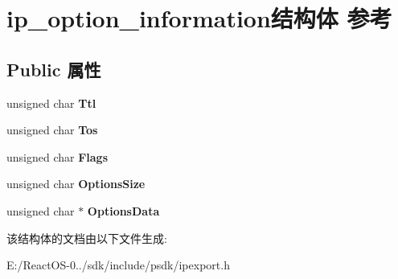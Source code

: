 \hypertarget{structip__option__information}{}\section{ip\+\_\+option\+\_\+information结构体 参考}
\label{structip__option__information}
\subsection*{Public 属性}
\begin{DoxyCompactItemize}
\item 
\mbox{\label{structip__option__information_a5a3a00ede902889832b7cfabcf227bbe}} 
unsigned char {\bfseries Ttl}
\item 
\mbox{\label{structip__option__information_a8ce99a7417c32f2d19bcc0819713b210}} 
unsigned char {\bfseries Tos}
\item 
\mbox{\label{structip__option__information_a273dcffc0ddc4d7e6b379b8ab0c6ef4c}} 
unsigned char {\bfseries Flags}
\item 
\mbox{\label{structip__option__information_adb27e6dd35b7949cad3b51829fdb3751}} 
unsigned char {\bfseries Options\+Size}
\item 
\mbox{\label{structip__option__information_a72682f53d37fae4680af1a00f8806acc}} 
unsigned char $\ast$ {\bfseries Options\+Data}
\end{DoxyCompactItemize}


该结构体的文档由以下文件生成\+:\begin{DoxyCompactItemize}
\item 
E\+:/\+React\+O\+S-\/0../sdk/include/psdk/ipexport.\+h\end{DoxyCompactItemize}
